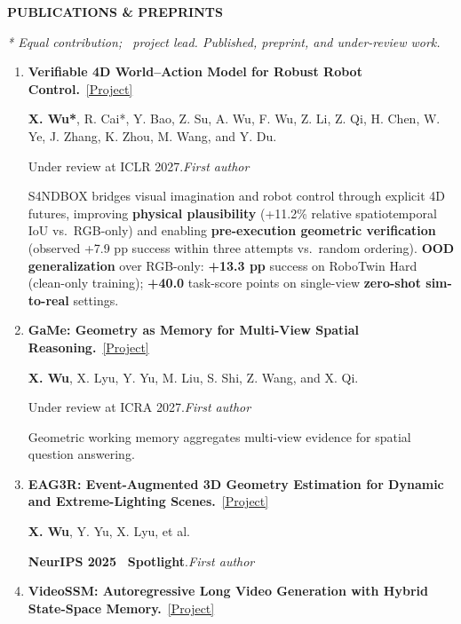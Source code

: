 \documentclass[a4paper]{article}
\newcommand{\cvsection}[1]{%
  \par\vspace{2.0pt}%
  {\color{cvblue}\fontsize{11}{12.2}\selectfont\bfseries\MakeUppercase{#1}}\par
  \vspace{-4pt}{\color{cvblue}\rule{\textwidth}{0.4pt}}\par\vspace{1.0pt}%
}
\newcommand{\pubgroup}[1]{%
  \par\vspace{2.0pt}{\color{cvblue}\fontsize{9.4}{10.4}\selectfont\bfseries #1}\par
}
\newcommand{\pubnote}[1]{\par{\color{cvgray}#1}}
\begin{document}
\cvsection{Publications \& Preprints}
{\fontsize{9}{9.65}\selectfont
\textit{* Equal contribution; \textdagger\ project lead. Published, preprint, and under-review work.}\par
\pubgroup{First- and Co-first-author Work}
\begin{enumerate}[leftmargin=1.6em,labelsep=0.38em,itemsep=0.4pt,topsep=1.3pt,parsep=0pt,partopsep=0pt]
\item \textbf{Verifiable 4D World--Action Model for Robust Robot Control.}~\href{https://candy-crusher.github.io/xiaoshanwu.github.io/projects/sandbox/}{\textcolor{cvblue}{[Project]}}\par
\textbf{X. Wu*}, R. Cai*, Y. Bao, Z. Su, A. Wu, F. Wu, Z. Li, Z. Qi, H. Chen, W. Ye, J. Zhang, K. Zhou, M. Wang, and Y. Du.\par
Under review at ICLR 2027.\hfill\textcolor{cvblue}{\textit{First author}}
\pubnote{S4NDBOX bridges visual imagination and robot control through explicit 4D futures, improving \textbf{physical plausibility} (+11.2\% relative spatiotemporal IoU vs.\ RGB-only) and enabling \textbf{pre-execution geometric verification} (observed +7.9 pp success within three attempts vs.\ random ordering).} \textbf{OOD generalization} over RGB-only: \textbf{+13.3 pp} success on RoboTwin Hard (clean-only training); \textbf{+40.0} task-score points on single-view \textbf{zero-shot sim-to-real} settings.
\item \textbf{GaMe: Geometry as Memory for Multi-View Spatial Reasoning.}~\href{https://candy-crusher.github.io/xiaoshanwu.github.io/projects/game/}{\textcolor{cvblue}{[Project]}}\par
\textbf{X. Wu}, X. Lyu, Y. Yu, M. Liu, S. Shi, Z. Wang, and X. Qi.\par
Under review at ICRA 2027.\hfill\textcolor{cvblue}{\textit{First author}}
\pubnote{Geometric working memory aggregates multi-view evidence for spatial question answering.}
\item \textbf{EAG3R: Event-Augmented 3D Geometry Estimation for Dynamic and Extreme-Lighting Scenes.}~\href{https://candy-crusher.github.io/xiaoshanwu.github.io/projects/eag3r/}{\textcolor{cvblue}{[Project]}}\par
\textbf{X. Wu}, Y. Yu, X. Lyu, et al.\par
\textbf{NeurIPS 2025} \textcolor{cvred}{\textbf{\textperiodcentered\ Spotlight}}.\hfill\textcolor{cvblue}{\textit{First author}}
\item \textbf{VideoSSM: Autoregressive Long Video Generation with Hybrid State-Space Memory.}~\href{https://candy-crusher.github.io/xiaoshanwu.github.io/projects/videossm/}{\textcolor{cvblue}{[Project]}}\par

\end{enumerate}}
\end{document}
